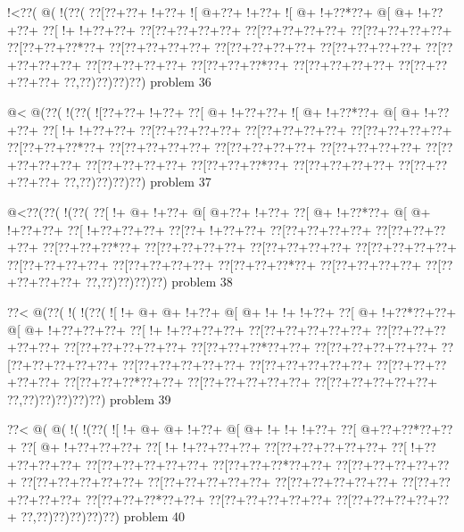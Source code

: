 \vbox{\vbox{\goo
\- !<\0??(\- @(\- !(\0??(
\0??[\0??+\0??+\- !+\0??+
\- ![\- @+\0??+\- !+\0??+
\- ![\- @+\- !+\0??*\0??+
\- @[\- @+\- !+\0??+\0??+
\0??[\- !+\- !+\0??+\0??+
\0??[\0??+\0??+\0??+\0??+
\0??[\0??+\0??+\0??+\0??+
\0??[\0??+\0??+\0??+\0??+
\0??[\0??+\0??+\0??*\0??+
\0??[\0??+\0??+\0??+\0??+
\0??[\0??+\0??+\0??+\0??+
\0??[\0??+\0??+\0??+\0??+
\0??[\0??+\0??+\0??+\0??+
\0??[\0??+\0??+\0??+\0??+
\0??[\0??+\0??+\0??*\0??+
\0??[\0??+\0??+\0??+\0??+
\0??[\0??+\0??+\0??+\0??+
\0??,\0??)\0??)\0??)\0??)
}
\hfil problem 36\hfil\break
}

\vbox{\vbox{\goo
\- @<\- @(\0??(\- !(\0??(
\- ![\0??+\0??+\- !+\0??+
\0??[\- @+\- !+\0??+\0??+
\- ![\- @+\- !+\0??*\0??+
\- @[\- @+\- !+\0??+\0??+
\0??[\- !+\- !+\0??+\0??+
\0??[\0??+\0??+\0??+\0??+
\0??[\0??+\0??+\0??+\0??+
\0??[\0??+\0??+\0??+\0??+
\0??[\0??+\0??+\0??*\0??+
\0??[\0??+\0??+\0??+\0??+
\0??[\0??+\0??+\0??+\0??+
\0??[\0??+\0??+\0??+\0??+
\0??[\0??+\0??+\0??+\0??+
\0??[\0??+\0??+\0??+\0??+
\0??[\0??+\0??+\0??*\0??+
\0??[\0??+\0??+\0??+\0??+
\0??[\0??+\0??+\0??+\0??+
\0??,\0??)\0??)\0??)\0??)
}
\hfil problem 37\hfil\break
}

\vbox{\vbox{\goo
\- @<\0??(\0??(\- !(\0??(
\0??[\- !+\- @+\- !+\0??+
\- @[\- @+\0??+\- !+\0??+
\0??[\- @+\- !+\0??*\0??+
\- @[\- @+\- !+\0??+\0??+
\0??[\- !+\0??+\0??+\0??+
\0??[\0??+\- !+\0??+\0??+
\0??[\0??+\0??+\0??+\0??+
\0??[\0??+\0??+\0??+\0??+
\0??[\0??+\0??+\0??*\0??+
\0??[\0??+\0??+\0??+\0??+
\0??[\0??+\0??+\0??+\0??+
\0??[\0??+\0??+\0??+\0??+
\0??[\0??+\0??+\0??+\0??+
\0??[\0??+\0??+\0??+\0??+
\0??[\0??+\0??+\0??*\0??+
\0??[\0??+\0??+\0??+\0??+
\0??[\0??+\0??+\0??+\0??+
\0??,\0??)\0??)\0??)\0??)
}
\hfil problem 38\hfil\break
}

\vbox{\vbox{\goo
\0??<\- @(\0??(\- !(\- !(\0??(
\- ![\- !+\- @+\- @+\- !+\0??+
\- @[\- @+\- !+\- !+\- !+\0??+
\0??[\- @+\- !+\0??*\0??+\0??+
\- @[\- @+\- !+\0??+\0??+\0??+
\0??[\- !+\- !+\0??+\0??+\0??+
\0??[\0??+\0??+\0??+\0??+\0??+
\0??[\0??+\0??+\0??+\0??+\0??+
\0??[\0??+\0??+\0??+\0??+\0??+
\0??[\0??+\0??+\0??*\0??+\0??+
\0??[\0??+\0??+\0??+\0??+\0??+
\0??[\0??+\0??+\0??+\0??+\0??+
\0??[\0??+\0??+\0??+\0??+\0??+
\0??[\0??+\0??+\0??+\0??+\0??+
\0??[\0??+\0??+\0??+\0??+\0??+
\0??[\0??+\0??+\0??*\0??+\0??+
\0??[\0??+\0??+\0??+\0??+\0??+
\0??[\0??+\0??+\0??+\0??+\0??+
\0??,\0??)\0??)\0??)\0??)\0??)
}
\hfil problem 39\hfil\break
}

\vbox{\vbox{\goo
\0??<\- @(\- @(\- !(\- !(\0??(
\- ![\- !+\- @+\- @+\- !+\0??+
\- @[\- @+\- !+\- !+\- !+\0??+
\0??[\- @+\0??+\0??*\0??+\0??+
\0??[\- @+\- !+\0??+\0??+\0??+
\0??[\- !+\- !+\0??+\0??+\0??+
\0??[\0??+\0??+\0??+\0??+\0??+
\0??[\- !+\0??+\0??+\0??+\0??+
\0??[\0??+\0??+\0??+\0??+\0??+
\0??[\0??+\0??+\0??*\0??+\0??+
\0??[\0??+\0??+\0??+\0??+\0??+
\0??[\0??+\0??+\0??+\0??+\0??+
\0??[\0??+\0??+\0??+\0??+\0??+
\0??[\0??+\0??+\0??+\0??+\0??+
\0??[\0??+\0??+\0??+\0??+\0??+
\0??[\0??+\0??+\0??*\0??+\0??+
\0??[\0??+\0??+\0??+\0??+\0??+
\0??[\0??+\0??+\0??+\0??+\0??+
\0??,\0??)\0??)\0??)\0??)\0??)
}
\hfil problem 40\hfil\break
}

